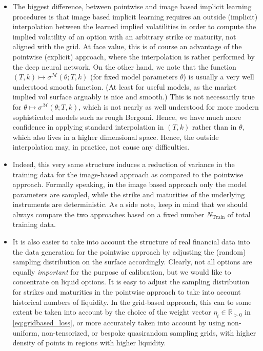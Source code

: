 \documentclass{article}
\theoremstyle{remark}
\begin{document}
\begin{itemize}
\item The biggest difference, between pointwise and image based implicit learning procedures
is  that image based implicit learning requires an outside (implicit) interpolation
between the learned implied volatilities in order to compute the implied
volatility of an option with an arbitrary strike or maturity, not aligned
with the grid. At face value, this is of course an advantage of the
pointwise (explicit) approach, where the interpolation is rather performed by the deep
neural network. On the other hand, we note that the function
$(T,k) \mapsto \sigma^{\mathcal{M}}(\theta; T,k)$ (for fixed model
parameters $\theta$) is usually a very well understood smooth function. (At
least for useful models, as the market implied vol surface arguably is nice
and smooth.) This is not necessarily true for
$\theta \mapsto \sigma^{\mathcal{M}}(\theta; T,k)$, which is not nearly as
well understood for more modern sophisticated models such as rough Bergomi. Hence, we
have much more confidence in applying standard interpolation in $(T,k)$
rather than in $\theta$, which also lives in a higher dimensional
space. Hence, the outside interpolation may, in practice, not cause any
difficulties. 

\item Indeed, this very same structure induces a reduction of variance in the
training data for the image-based approach as compared to the pointwise
approach. Formally speaking, in the image based approach only the
model parameters are sampled, while the strike and maturities of the
underlying instruments are deterministic. As a side note, keep in mind that we
should always compare the two approaches based on a fixed number $N_{\mathrm{Train}}$
of total training data.

\item It is also easier to take into account the structure of real financial data
into the data generation for the pointwise approach by adjusting the (random) sampling distribution on the surface accordingly. Clearly, not all options
are equally \emph{important} for the purpose of calibration, but we would like
to concentrate on liquid options. It is easy to adjust the sampling
distribution for strikes and maturities in the pointwise approach to take into
account historical numbers of liquidity. In the grid-based approach, this can to some extent be taken into account by the choice of the weight vector $\eta_i \in \mathbb{R}_{>0}$ in \eqref{eq:gridbased_loss}, or more accurately taken into account by using non-uniform, non-tensorized, or bespoke quasirandom sampling
grids, with higher density of points in regions with higher liquidity. 



\end{itemize}
\end{document}
